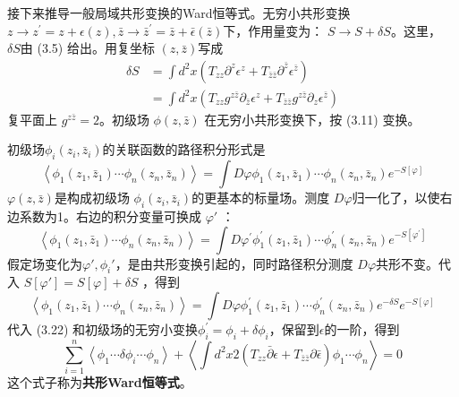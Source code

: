 接下来推导一般局域共形变换的Ward恒等式。无穷小共形变换$ z \rightarrow z^{\prime}=z+\epsilon(z), \bar{z}\to\bar{z}^{\prime}=\bar{z}+\bar{\epsilon}(\bar{z}) $下，作用量变为： $S\to S+\delta S $。这里， $\delta S $由 (3.5) 给出。用复坐标 $(z,\bar{z}) $写成
\begin{equation}
\begin{aligned} \delta S &=\int d^{2} x\left(T_{z z} \partial^{z} \epsilon^{z}+T_{\bar{z} \bar{z}} \partial^{\bar{z}} \epsilon^{\bar{z}}\right) \\ &=\int d^{2} x\left(T_{z z} g^{z \bar{z}} \partial_{\bar{z}} \epsilon^{z}+T_{\bar{z} \bar{z}} g^{z \bar{z}} \partial_{z} \epsilon^{\bar{z}}\right) \end{aligned}
\end{equation}
复平面上 $g^{z\bar{z}}=2 $。初级场 $\phi(z,\bar{z})$ 在无穷小共形变换下，按 (3.11) 变换。

初级场$ \phi_i(z_i,\bar{z}_i) $的关联函数的路径积分形式是
\[
\left\langle\phi_{1}\left(z_{1}, \bar{z}_{1}\right) \cdots \phi_{n}\left(z_{n}, \bar{z}_{n}\right)\right\rangle=\int D \varphi \phi_{1}\left(z_{1}, \bar{z}_{1}\right) \cdots \phi_{n}\left(z_{n}, \bar{z}_{n}\right) e^{-S[\varphi]}
\]
$\varphi(z,\bar{z}) $是构成初级场 $\phi_i(z_i,\bar{z}_i) $的更基本的标量场。测度 $D\varphi $归一化了，以使右边系数为1。右边的积分变量可换成 $\varphi'$ ：
\[
\left\langle\phi_{1}\left(z_{1}, \bar{z}_{1}\right) \cdots \phi_{n}\left(z_{n}, \bar{z}_{n}\right)\right\rangle=\int D \varphi^{\prime} \phi_{1}^{\prime}\left(z_{1}, \bar{z}_{1}\right) \cdots \phi_{n}^{\prime}\left(z_{n}, \bar{z}_{n}\right) e^{-S\left[\varphi^{\prime}\right]}
\]
假定场变化为$ \varphi',\phi_i' $，是由共形变换引起的，同时路径积分测度 $D\varphi $共形不变。代入 $S[\varphi']=S[\varphi]+\delta S$ ，得到
\[
\left\langle\phi_{1}\left(z_{1}, \bar{z}_{1}\right) \cdots \phi_{n}\left(z_{n}, \bar{z}_{n}\right)\right\rangle=\int D \varphi \phi_{1}^{\prime}\left(z_{1}, \bar{z}_{1}\right) \cdots \phi_{n}^{\prime}\left(z_{n}, \bar{z}_{n}\right) e^{-\delta S} e^{-S[\varphi]}
\]
代入 (3.22) 和初级场的无穷小变换$ \phi_{i}^{\prime}=\phi_{i}+\delta \phi_{i} $，保留到$ \epsilon $的一阶，得到
\begin{equation}
\sum_{i=1}^{n}\left\langle\phi_{1} \cdots \delta \phi_{i} \cdots \phi_{n}\right\rangle+\left\langle\int d^{2} x 2\left(T_{z z} \bar{\partial} \epsilon+T_{\bar{z} \bar{z}} \partial \bar{\epsilon}\right) \phi_{1} \cdots \phi_{n}\right\rangle=0
\end{equation}
这个式子称为\textbf{共形Ward恒等式}。

